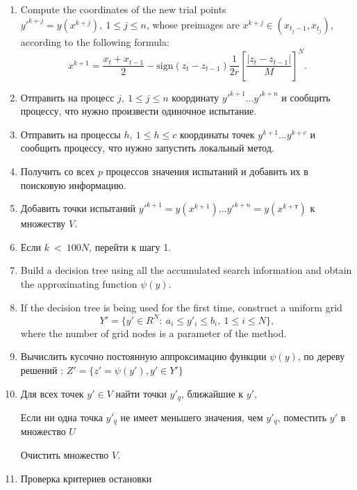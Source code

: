 \documentclass[runningheads]{llncs}
\begin{document}
\begin{enumerate}
	\item Compute the coordinates of the new trial points $y'^{k+j}=y\left(x^{k+j}\right), \ 1\leq j\leq n$, whose preimages are  $x^{k+j}\in\left(x_{t_j-1},x_{t_j}\right)$, according to the following formula:
	\begin{equation}
		\label{agp5_x1}
		x^{k+1}=\frac{x_t+x_{t-1}}{2}-\mathrm{sign}\left(z_t-z_{t-1}\right)\frac{1}{2r}\left[\frac{\left|z_t-z_{t-1}\right|}{M}\right]^N.
	\end{equation}	
	
	
	\item Отправить на процесс $j, \ 1\leq j\leq n$ координату $y'^{k+1} ... y'^{k+n}$  и сообщить процессу, что нужно произвести одиночное испытание.
	
	\item Отправить на процессы $h, \ 1\leq h\leq c$ координаты точек $y^{k+1} ... y^{k+c}$ и сообщить процессу, что нужно запустить локальный метод.
	
	\item Получить со всех $p$ процессов значения испытаний и добавить их в поисковую информацию.
	
	\item Добавить точки испытаний $y'^{k+1}=y\left(x^{k+1}\right) ... y'^{k+n}=y\left(x^{k+т}\right)$ к множеству $V$.
	
	\item Если $k\ <\ 100 N$, перейти к шагу 1.
	
	
	\item Build a decision tree using all the accumulated search information and obtain the approximating function $\psi(y)$.
	
	\item If the decision tree is being used for the first time, construct a uniform grid
	\begin{displaymath} 
		Y'=\{ y'\in R^N:\ a_i\le y'_i \le b_i,\ 1\le i\le N \},
	\end{displaymath} 
	where the number of grid nodes is a parameter of the method.
	
	\item Вычислить кусочно постоянную аппроксимацию функции $\psi(y)$, по дереву решений : $Z' = \{ z'=  \psi(y'), y' \in Y'\}$
	
	\item Для всех точек $y'\in V$ найти точки $y'_q$, ближайшие к $y'$,
	
	Если ни одна точка $y'_q$ не имеет меньшего значения, чем $y'_q$, поместить $y'$ в множество $U$
	
	Очистить множество $V$.
	
	\item Проверка критериев остановки
	
	
\end{enumerate}
\end{document}
